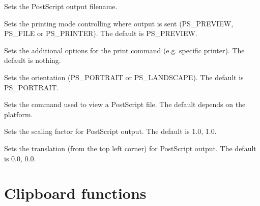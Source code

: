 \label{wxsetprinterfile}


Sets the PostScript output filename.


\label{wxsetprintermode}


Sets the printing mode controlling where output is sent (PS\_PREVIEW, PS\_FILE or PS\_PRINTER).
The default is PS\_PREVIEW.


\label{wxsetprinteroptions}


Sets the additional options for the print command (e.g. specific printer). The default is nothing.


\label{wxsetprinterorientation}


Sets the orientation (PS\_PORTRAIT or PS\_LANDSCAPE). The default is PS\_PORTRAIT.


\label{wxsetprinterpreviewcommand}


Sets the command used to view a PostScript file. The default depends on the platform.


\label{wxsetprinterscaling}


Sets the scaling factor for PostScript output. The default is 1.0, 1.0.


\label{wxsetprintertranslation}


Sets the translation (from the top left corner) for PostScript output. The default is 0.0, 0.0.



\section{Clipboard functions}\label{clipsboard}

